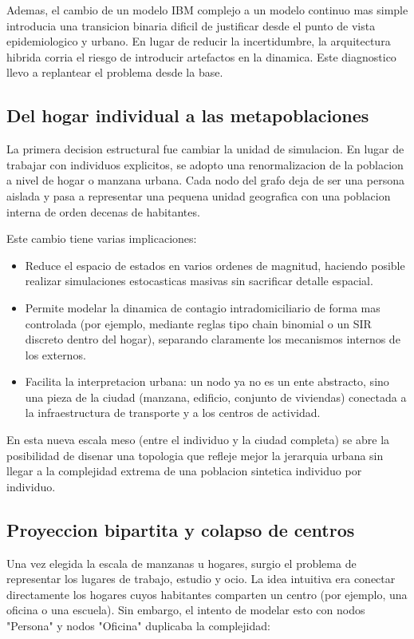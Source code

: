 Ademas, el cambio de un modelo IBM complejo a un modelo continuo mas simple introducia una transicion binaria dificil de justificar desde el punto de vista epidemiologico y urbano. En lugar de reducir la incertidumbre, la arquitectura hibrida corria el riesgo de introducir artefactos en la dinamica. Este diagnostico llevo a replantear el problema desde la base.

\subsection{Del hogar individual a las metapoblaciones}

La primera decision estructural fue cambiar la unidad de simulacion. En lugar de trabajar con individuos explicitos, se adopto una renormalizacion de la poblacion a nivel de hogar o manzana urbana. Cada nodo del grafo deja de ser una persona aislada y pasa a representar una pequena unidad geografica con una poblacion interna de orden decenas de habitantes.

Este cambio tiene varias implicaciones:

\begin{itemize}
    \item Reduce el espacio de estados en varios ordenes de magnitud, haciendo posible realizar simulaciones estocasticas masivas sin sacrificar detalle espacial.
    \item Permite modelar la dinamica de contagio intradomiciliario de forma mas controlada (por ejemplo, mediante reglas tipo chain binomial o un SIR discreto dentro del hogar), separando claramente los mecanismos internos de los externos.
    \item Facilita la interpretacion urbana: un nodo ya no es un ente abstracto, sino una pieza de la ciudad (manzana, edificio, conjunto de viviendas) conectada a la infraestructura de transporte y a los centros de actividad.
\end{itemize}

En esta nueva escala meso (entre el individuo y la ciudad completa) se abre la posibilidad de dise{n}ar una topologia que refleje mejor la jerarquia urbana sin llegar a la complejidad extrema de una poblacion sintetica individuo por individuo.

\subsection{Proyeccion bipartita y colapso de centros}

Una vez elegida la escala de manzanas u hogares, surgio el problema de representar los lugares de trabajo, estudio y ocio. La idea intuitiva era conectar directamente los hogares cuyos habitantes comparten un centro (por ejemplo, una oficina o una escuela). Sin embargo, el intento de modelar esto con nodos "Persona" y nodos "Oficina" duplicaba la complejidad:

